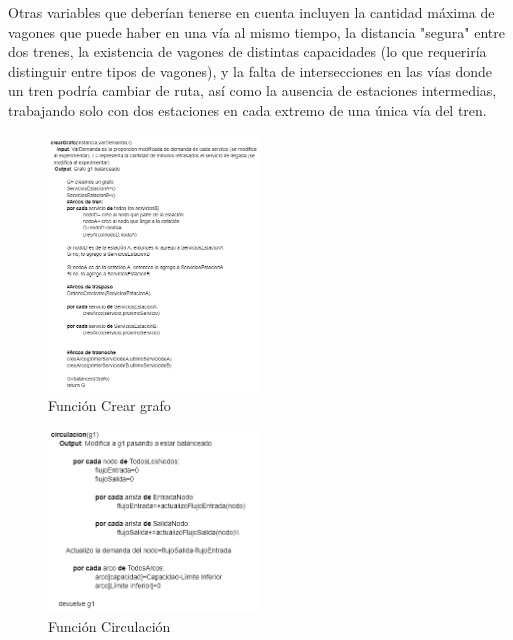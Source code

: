\documentclass{article}
\begin{document}
Otras variables que deberían tenerse en cuenta incluyen la cantidad máxima de vagones que puede haber en una vía al mismo tiempo, la distancia "segura" entre dos trenes, la existencia de vagones de distintas capacidades (lo que requeriría distinguir entre tipos de vagones), y la falta de intersecciones en las vías donde un tren podría cambiar de ruta, así como la ausencia de estaciones intermedias, trabajando solo con dos estaciones en cada extremo de una única vía del tren.
    \begin{figure}[htbp]
    \centering
    \includegraphics[width=0.5\textwidth]{imagen_pseudo.png}
    \caption{Función Crear grafo}

    \label{fig:ejemplo}
    \end{figure}
    \begin{figure}[htbp]
    \centering
    \includegraphics[width=0.5\textwidth]{image.png}
    \caption{Función Circulación}

    \label{fig:ejemplo}
    \end{figure}
        
\end{document}
